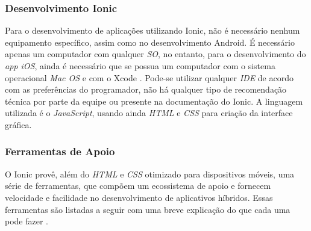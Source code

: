 \subsubsection{Desenvolvimento Ionic} \label{subsubsection:dev-ionic}
Para o desenvolvimento de aplicações utilizando Ionic, não é necessário nenhum equipamento específico, assim como no desenvolvimento Android.
É necessário apenas um computador com qualquer \textit{SO}, no entanto, para o desenvolvimento do \textit{app iOS}, ainda é necessário que se possua um computador com o sistema operacional 
\textit{Mac OS} e com o Xcode \cite{drifty_installing_2016}.
Pode-se utilizar qualquer \textit{IDE} de acordo com as preferências do programador, não há qualquer tipo de recomendação técnica por parte da equipe ou presente na documentação do Ionic.
A linguagem utilizada é o \textit{JavaScript}, usando ainda \textit{HTML} e \textit{CSS} para criação da interface gráfica.

\subsubsection{Ferramentas de Apoio} \label{subsection:ionicferramentasapoio}

O Ionic provê, além do \textit{HTML} e \textit{CSS} otimizado para dispositivos móveis, 
uma série de ferramentas, que compõem um ecossistema de apoio e fornecem velocidade e facilidade no desenvolvimento de aplicativos híbridos. 
Essas ferramentas são listadas a seguir com uma breve explicação do que cada uma pode fazer \cite{drifty_ionic:_2016}.

